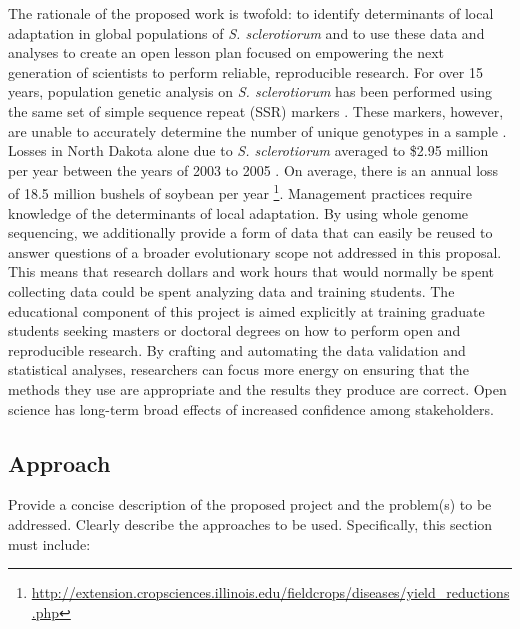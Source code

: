 \documentclass[12pt,letterpaper]{article}
\begin{document}
The rationale of the proposed work is twofold: to identify determinants of local adaptation in global populations of \textit{S. sclerotiorum} and to use these data and analyses to create an open lesson plan focused on empowering the next generation of scientists to perform reliable, reproducible research. 
For over 15 years, population genetic analysis on \textit{S. sclerotiorum} has been performed using the same set of simple sequence repeat (SSR) markers \citep{sirjusingh2001characterization}. 
These markers, however, are unable to accurately determine the number of unique genotypes in a sample \citep{lehner2017independently,lehner2017sclerotinia,arnaud2007standardizing}.   
Losses in North Dakota alone due to \textit{S. sclerotiorum} averaged to \$2.95 million per year between the years of 2003 to 2005 \cite{ramasubramaniam2008estimates}. On average, there is an annual loss of 18.5 million bushels of soybean per year \footnote{\url{http://extension.cropsciences.illinois.edu/fieldcrops/diseases/yield_reductions.php}}.
Management practices require knowledge of the determinants of local adaptation. 
By using whole genome sequencing, we additionally provide a form of data that can easily be reused to answer questions of a broader evolutionary scope not addressed in this proposal. 
This means that research dollars and work hours that would normally be spent collecting data could be spent analyzing data and training students. 
The educational component of this project is aimed explicitly at training graduate students seeking masters or doctoral degrees on how to perform open and reproducible research. 
By crafting and automating the data validation and statistical analyses, researchers can focus more energy on ensuring that the methods they use are appropriate and the results they produce are correct. 
Open science has long-term broad effects of increased confidence among stakeholders. 




\subsection{Approach}


Provide a concise description of the proposed project and the problem(s) to be
addressed. Clearly describe the approaches to be used. Specifically, this
section must include:
\end{document}
